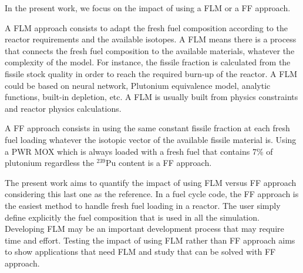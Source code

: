 In the present work, we focus on the impact of using a \gls{FLM} or a \gls{FF} approach. 

A \gls{FLM} approach consists to adapt the fresh fuel composition according to
the reactor requirements and the available isotopes. A \gls{FLM} means there is a
process that connects the fresh fuel composition to the available materials,
whatever the complexity of the model. For instance, the fissile fraction is
calculated from the fissile stock quality in order to reach the required burn-up
of the reactor. A \gls{FLM} could be based on neural network, Plutonium
equivalence model, analytic functions, built-in depletion, etc. A \gls{FLM} is
usually built from physics constraints and reactor physics calculations. 

A \gls{FF} approach consists in using the same constant fissile
fraction at each fresh fuel loading whatever the isotopic vector of the
available fissile material is. Using a PWR MOX which is always loaded with a
fresh fuel that contains 7\% of plutonium regardless the $^{239}$Pu content is a
\gls{FF} approach. 

The present work aims to quantify the impact of using \gls{FLM} versus \gls{FF}
approach considering this last one as the reference. In a fuel cycle code, the
\gls{FF} approach is the easiest method to handle fresh fuel loading in a reactor. The
user simply define explicitly the fuel composition that is used in all the
simulation. Developing \gls{FLM} may be an important development process that
may require time and effort. Testing the impact of using \gls{FLM} rather than
\gls{FF} approach aims to show applications that need \gls{FLM} and study that can be
solved with \gls{FF} approach.

